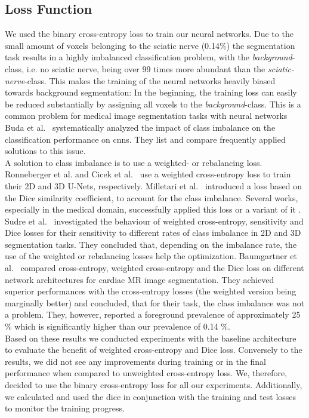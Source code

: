 \subsection{Loss Function}
We used the binary cross-entropy loss to train our neural networks. Due to the small amount of voxels belonging to the sciatic nerve (0.14\%) the segmentation task results in a highly imbalanced classification problem, with the \textit{background}-class, i.e. no sciatic nerve, being over 99 times more abundant than the \textit{sciatic-nerve}-class. This makes the training of the neural networks heavily biased towards background segmentation: In the beginning, the training loss can easily be reduced substantially by assigning all voxels to the \textit{background}-class. This is a common problem for medical image segmentation tasks with neural networks~\cite{Litjens2017AAnalysis,Tetteh2018DeepVesselNet:Volumes,Baumgartner2017AnSegmentation,Selvan2018ExtractionNetworks,Kayalibay2017CNN-basedData}\\
Buda et al.~\cite{BudaANetworks} systematically analyzed the impact of class imbalance on the classification performance on \acrshort{cnn}s. They list and compare frequently applied solutions to this issue.\\
A solution to class imbalance is to use a weighted- or rebalancing loss. Ronneberger et al. \cite{Ronneberger2015U-Net:Segmentation} and Cicek et al.~\cite{Cicek20163DAnnotation} use a weighted cross-entropy loss to train their 2D and 3D U-Nets, respectively. Milletari et al.~\cite{Milletari2016V-Net:Segmentation} introduced a loss based on the Dice similarity coefficient, to account for the class imbalance. Several works, especially in the medical domain, successfully applied this loss or a variant of it \cite{Selvan2018ExtractionNetworks,Kayalibay2017CNN-basedData,Drozdzal2016TheSegmentation}. Sudre et al.~\cite{Sudre2017GeneralisedSegmentations} investigated the behaviour of weighted cross-entropy, sensitivity and Dice losses for their sensitivity to different rates of class imbalance in 2D and 3D segmentation tasks. They concluded that, depending on the imbalance rate, the use of the weighted or rebalancing losses help the optimization. Baumgartner et al.~\cite{Baumgartner2017AnSegmentation} compared cross-entropy, weighted cross-entropy and the Dice loss on different network architectures for cardiac MR image segmentation. They achieved superior performances with the cross-entropy losses (the weighted version being marginally better) and concluded, that for their task, the class imbalance was not a problem. They, however, reported a foreground prevalence of approximately 25 \% which is significantly higher than our prevalence of 0.14 \%.\\
Based on these results we conducted experiments with the baseline architecture to evaluate the benefit of weighted cross-entropy and Dice loss. Conversely to the results, we did not see any improvements during training or in the final performance when compared to unweighted cross-entropy loss. We, therefore, decided to use the binary cross-entropy loss for all our experiments. Additionally, we calculated and used the \acrlong{dice} in conjunction with the training and test losses to monitor the training progress.


